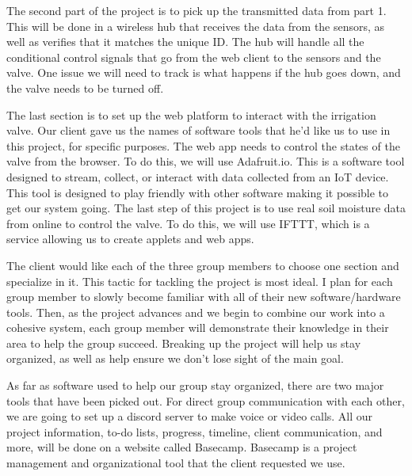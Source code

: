 \documentclass[journal,10pt,onecolumn,draftclsnofoot,]{IEEEtran}
\begin{document}
The second part of the project is to pick up the transmitted data from part 1. This will be done in a wireless hub that receives the data from the sensors, as well as verifies that it matches the unique ID. The hub will handle all the conditional control signals that go from the web client to the sensors and the valve. One issue we will need to track is what happens if the hub goes down, and the valve needs to be turned off. 
\newline

The last section is to set up the web platform to interact with the irrigation valve. Our client gave us the names of software tools that he’d like us to use in this project, for specific purposes. The web app needs to control the states of the valve from the browser. To do this, we will use Adafruit.io. This is a software tool designed to stream, collect, or interact with data collected from an IoT device. This tool is designed to play friendly with other software making it possible to get our system going. The last step of this project is to use real soil moisture data from online to control the valve. To do this, we will use IFTTT, which is a service allowing us to create applets and web apps. 
\newline

The client would like each of the three group members to choose one section and specialize in it. This tactic for tackling the project is most ideal. I plan for each group member to slowly become familiar with all of their new software/hardware tools. Then, as the project advances and we begin to combine our work into a cohesive system, each group member will demonstrate their knowledge in their area to help the group succeed. Breaking up the project will help us stay organized, as well as help ensure we don’t lose sight of the main goal.
\newline

As far as software used to help our group stay organized, there are two major tools that have been picked out. For direct group communication with each other, we are going to set up a discord server to make voice or video calls. All our project information, to-do lists, progress, timeline, client communication, and more, will be done on a website called Basecamp.  Basecamp is a project management and organizational tool that the client requested we use.
\newline
\end{document}
